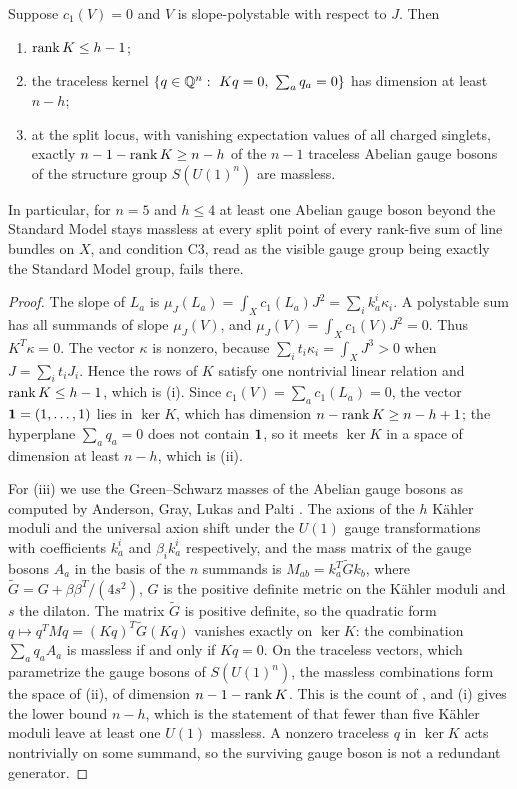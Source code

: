 \begin{theorem}\label{thm:forced}
Suppose $c_1(V)=0$ and $V$ is slope-polystable with respect to $J$. Then
\begin{enumerate}[label=\textup{(\roman*)},leftmargin=*,itemsep=1pt]
\item $\operatorname{rank} K\le h-1$;
\item the traceless kernel $\{q\in\Q^n:\ Kq=0,\ \sum_aq_a=0\}$ has dimension
at least $n-h$;
\item at the split locus, with vanishing expectation values of all charged
singlets, exactly $n-1-\operatorname{rank} K\ge n-h$ of the $n-1$ traceless Abelian gauge
bosons of the structure group $S(U(1)^n)$ are massless.
\end{enumerate}
In particular, for $n=5$ and $h\le4$ at least one Abelian gauge boson
beyond the Standard Model stays massless at every split point of every
rank-five sum of line bundles on $X$, and condition C3, read as the
visible gauge group being exactly the Standard Model group, fails there.
\end{theorem}
\begin{proof}
The slope of $L_a$ is $\mu_J(L_a)=\int_Xc_1(L_a)J^2=\sum_ik_a^i\kappa_i$.
A polystable sum has all summands of slope $\mu_J(V)$, and
$\mu_J(V)=\int_Xc_1(V)J^2=0$. Thus $K^{T}\kappa=0$. The vector $\kappa$ is
nonzero, because $\sum_it_i\kappa_i=\int_XJ^3>0$ when $J=\sum_it_iJ_i$.
Hence the rows of $K$ satisfy one nontrivial linear relation and
$\operatorname{rank} K\le h-1$, which is (i). Since $c_1(V)=\sum_ac_1(L_a)=0$, the vector
$\mathbf{1}=(1,\dots,1)$ lies in $\ker K$, which has dimension
$n-\operatorname{rank} K\ge n-h+1$; the hyperplane $\sum_aq_a=0$ does not contain $\mathbf{1}$,
so it meets $\ker K$ in a space of dimension at least $n-h$, which is (ii).

For (iii) we use the Green--Schwarz masses of the Abelian gauge bosons as
computed by Anderson, Gray, Lukas and Palti \cite[Section~2.7]{AGLP12}.
The axions of the $h$ K\"ahler moduli and the universal axion shift under
the $U(1)$ gauge transformations with coefficients $k_a^i$ and
$\beta_ik_a^i$ respectively, and the mass matrix of the gauge bosons
$A_a$ in the basis of the $n$ summands is
$M_{ab}=k_a^{T}\widetilde Gk_b$, where
$\widetilde G=G+\beta\beta^{T}/(4s^2)$, $G$ is the positive definite
metric on the K\"ahler moduli and $s$ the dilaton. The matrix
$\widetilde G$ is positive definite, so the quadratic form
$q\mapsto q^{T}Mq=(Kq)^{T}\widetilde G(Kq)$ vanishes exactly on $\ker K$:
the combination $\sum_aq_aA_a$ is massless if and only if $Kq=0$. On the
traceless vectors, which parametrize the gauge bosons of $S(U(1)^n)$, the
massless combinations form the space of (ii), of dimension
$n-1-\operatorname{rank} K$. This is the count of \cite[eq.~(2.31)]{AGLP12}, and (i) gives
the lower bound $n-h$, which is the statement of \cite[eq.~(2.32)]{AGLP12}
that fewer than five K\"ahler moduli leave at least one $U(1)$ massless.
A nonzero traceless $q$ in $\ker K$ acts nontrivially on some summand, so
the surviving gauge boson is not a redundant generator.
\end{proof}

